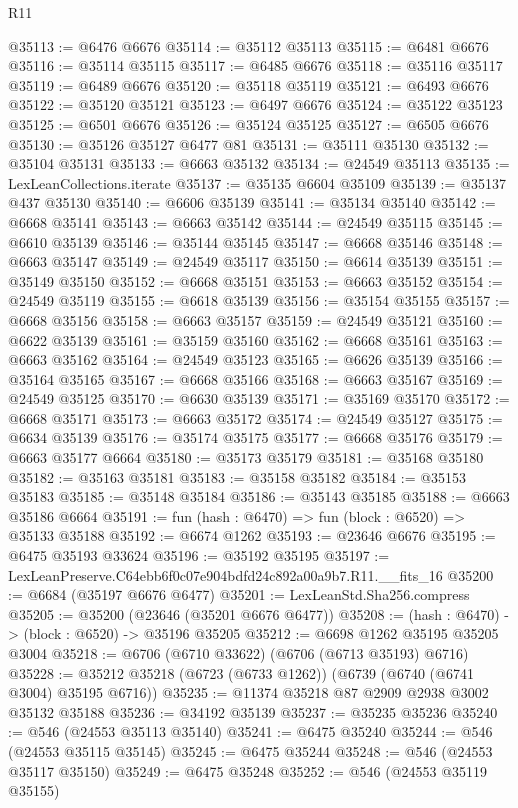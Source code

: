 \begin{lexlean}{R11}
\begin{coremodule}
@35113 := @6476 @6676
@35114 := @35112 @35113
@35115 := @6481 @6676
@35116 := @35114 @35115
@35117 := @6485 @6676
@35118 := @35116 @35117
@35119 := @6489 @6676
@35120 := @35118 @35119
@35121 := @6493 @6676
@35122 := @35120 @35121
@35123 := @6497 @6676
@35124 := @35122 @35123
@35125 := @6501 @6676
@35126 := @35124 @35125
@35127 := @6505 @6676
@35130 := @35126 @35127 @6477 @81
@35131 := @35111 @35130
@35132 := @35104 @35131
@35133 := @6663 @35132
@35134 := @24549 @35113
@35135 := LexLeanCollections.iterate
@35137 := @35135 @6604 @35109
@35139 := @35137 @437 @35130
@35140 := @6606 @35139
@35141 := @35134 @35140
@35142 := @6668 @35141
@35143 := @6663 @35142
@35144 := @24549 @35115
@35145 := @6610 @35139
@35146 := @35144 @35145
@35147 := @6668 @35146
@35148 := @6663 @35147
@35149 := @24549 @35117
@35150 := @6614 @35139
@35151 := @35149 @35150
@35152 := @6668 @35151
@35153 := @6663 @35152
@35154 := @24549 @35119
@35155 := @6618 @35139
@35156 := @35154 @35155
@35157 := @6668 @35156
@35158 := @6663 @35157
@35159 := @24549 @35121
@35160 := @6622 @35139
@35161 := @35159 @35160
@35162 := @6668 @35161
@35163 := @6663 @35162
@35164 := @24549 @35123
@35165 := @6626 @35139
@35166 := @35164 @35165
@35167 := @6668 @35166
@35168 := @6663 @35167
@35169 := @24549 @35125
@35170 := @6630 @35139
@35171 := @35169 @35170
@35172 := @6668 @35171
@35173 := @6663 @35172
@35174 := @24549 @35127
@35175 := @6634 @35139
@35176 := @35174 @35175
@35177 := @6668 @35176
@35179 := @6663 @35177 @6664
@35180 := @35173 @35179
@35181 := @35168 @35180
@35182 := @35163 @35181
@35183 := @35158 @35182
@35184 := @35153 @35183
@35185 := @35148 @35184
@35186 := @35143 @35185
@35188 := @6663 @35186 @6664
@35191 := fun (hash : @6470) => fun (block : @6520) => @35133 @35188
@35192 := @6674 @1262
@35193 := @23646 @6676
@35195 := @6475 @35193 @33624
@35196 := @35192 @35195
@35197 := LexLeanPreserve.C64ebb6f0c07e904bdfd24c892a00a9b7.R11.__fits_16
@35200 := @6684 (@35197 @6676 @6477)
@35201 := LexLeanStd.Sha256.compress
@35205 := @35200 (@23646 (@35201 @6676 @6477))
@35208 := (hash : @6470) -> (block : @6520) -> @35196 @35205
@35212 := @6698 @1262 @35195 @35205 @3004
@35218 := @6706 (@6710 @33622) (@6706 (@6713 @35193) @6716)
@35228 := @35212 @35218 (@6723 (@6733 @1262)) (@6739 (@6740 (@6741 @3004) @35195 @6716))
@35235 := @11374 @35218 @87 @2909 @2938 @3002 @35132 @35188
@35236 := @34192 @35139
@35237 := @35235 @35236
@35240 := @546 (@24553 @35113 @35140)
@35241 := @6475 @35240
@35244 := @546 (@24553 @35115 @35145)
@35245 := @6475 @35244
@35248 := @546 (@24553 @35117 @35150)
@35249 := @6475 @35248
@35252 := @546 (@24553 @35119 @35155)

\end{coremodule}
\end{lexlean}
